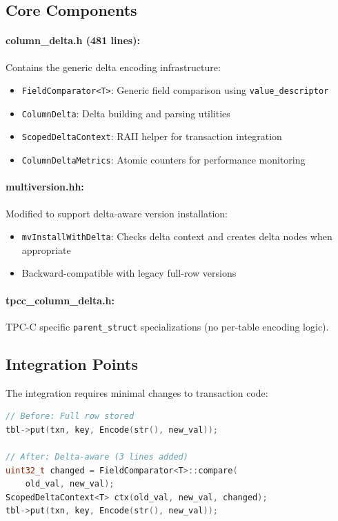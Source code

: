 \documentclass[letterpaper,twocolumn,10pt]{article}
\begin{document}
\subsection{Core Components}

\paragraph{column\_delta.h (481 lines):} Contains the generic delta encoding infrastructure:
\begin{itemize}
\item \texttt{FieldComparator<T>}: Generic field comparison using \texttt{value\_descriptor}
\item \texttt{ColumnDelta}: Delta building and parsing utilities
\item \texttt{ScopedDeltaContext}: RAII helper for transaction integration
\item \texttt{ColumnDeltaMetrics}: Atomic counters for performance monitoring
\end{itemize}

\paragraph{multiversion.hh:} Modified to support delta-aware version installation:
\begin{itemize}
\item \texttt{mvInstallWithDelta}: Checks delta context and creates delta nodes when appropriate
\item Backward-compatible with legacy full-row versions
\end{itemize}

\paragraph{tpcc\_column\_delta.h:} TPC-C specific \texttt{parent\_struct} specializations (no per-table encoding logic).

\subsection{Integration Points}

The integration requires minimal changes to transaction code:

\begin{lstlisting}[language=C++,basicstyle=\small\ttfamily]
// Before: Full row stored
tbl->put(txn, key, Encode(str(), new_val));

// After: Delta-aware (3 lines added)
uint32_t changed = FieldComparator<T>::compare(
    old_val, new_val);
ScopedDeltaContext<T> ctx(old_val, new_val, changed);
tbl->put(txn, key, Encode(str(), new_val));
\end{lstlisting}
\end{document}
